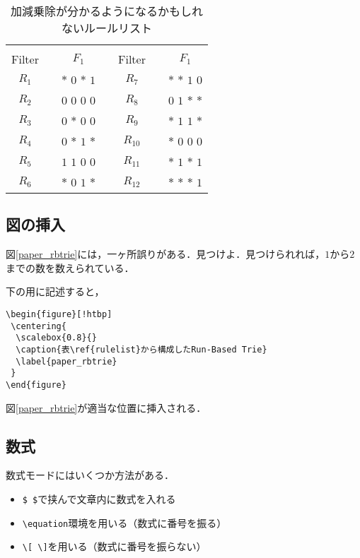 \documentclass[10pt,twocolumn]{jarticle}
\begin{document}
\begin{table}[htbp]
 \begin{center}
  \caption{加減乗除が分かるようになるかもしれないルールリスト}
  \begin{tabular}{ccccccc}
        & &             & &        & &             \\ \cline{1-3} \cline{5-7}
 Filter & & $F_{1}$      & & Filter & & $F_{1}$      \\ \cline{1-3} \cline{5-7}
 $R_{1}$ & & $*$ $0$ $*$ $1$ & & $R_{7}$ & & $*$ $*$ $1$ $0$ \\
 $R_{2}$ & & $0$ $0$ $0$ $0$ & & $R_{8}$ & & $0$ $1$ $*$ $*$ \\
 $R_{3}$ & & $0$ $*$ $0$ $0$ & & $R_{9}$ & & $*$ $1$ $1$ $*$ \\
 $R_{4}$ & & $0$ $*$ $1$ $*$ & & $R_{10}$ & & $*$ $0$ $0$ $0$ \\
 $R_{5}$ & & $1$ $1$ $0$ $0$ & & $R_{11}$ & & $*$ $1$ $*$ $1$ \\
 $R_{6}$ & & $*$ $0$ $1$ $*$ & & $R_{12}$ & & $*$ $*$ $*$ $1$ \\ \cline{1-3} \cline{5-7}
  \end{tabular}
  \label{rulelist}
 \end{center}
\end{table}

\subsection{図の挿入}
図\ref{paper_rbtrie}には，一ヶ所誤りがある．見つけよ．見つけられれば，$1$から$2$までの数を数えられている．\par
\noindent 下の用に記述すると，
\begin{verbatim}
\begin{figure}[!htbp]
 \centering{
  \scalebox{0.8}{}
  \caption{表\ref{rulelist}から構成したRun-Based Trie}
  \label{paper_rbtrie}
 }
\end{figure}
\end{verbatim}

図\ref{paper_rbtrie}が適当な位置に挿入される．
\begin{figure*}[!htbp]
\end{figure*}

\subsection{数式}
数式モードにはいくつか方法がある．
\begin{itemize}
 \item \verb|$ $|で挟んで文章内に数式を入れる
 \item \verb|\equation|環境を用いる（数式に番号を振る）
 \item \verb|\[ \]|を用いる（数式に番号を振らない）
\end{itemize}
\end{document}
